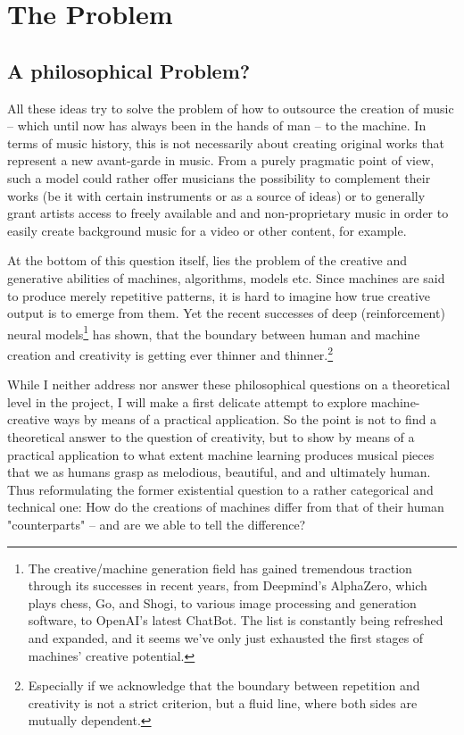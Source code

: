 \documentclass[a4paper, 10pt, xcolor=dvipsnames]{article} %
\begin{document}
\section{The Problem}
\subsection{A philosophical Problem?}

All these ideas try to solve the problem of how to outsource the creation of
music -- which until now has always been in the hands of man -- to the machine.
In terms of music history, this is not necessarily about creating original
works that represent a new avant-garde in music. From a purely pragmatic point
of view, such a model could rather offer musicians the possibility to
complement their works (be it with certain instruments or as a source of ideas)
or to generally grant artists access to freely available and and
non-proprietary music in order to easily create background music for a video or
other content, for example.

At the bottom of this question itself, lies the problem of the creative and
generative abilities of machines, algorithms, models etc. Since machines are
said to produce merely repetitive patterns, it is hard to imagine how true
creative output is to emerge from them. Yet the recent successes of deep
(reinforcement) neural models\footnote{The creative/machine generation field
  has gained tremendous traction through its successes in recent years, from
  Deepmind's AlphaZero, which plays chess, Go, and Shogi, to various image
  processing and generation software, to OpenAI's latest ChatBot. The list is
  constantly being refreshed and expanded, and it seems we've only just exhausted
  the first stages of machines' creative potential.} has shown, that the boundary
between human and machine creation and creativity is getting ever thinner and
thinner.\footnote{Especially if we acknowledge that the boundary between
  repetition and creativity is not a strict criterion, but a fluid line, where
  both sides are mutually dependent.}

While I neither address nor answer these philosophical questions on a
theoretical level in the project, I will make a first delicate attempt to
explore machine-creative ways by means of a practical application. So the point
is not to find a theoretical answer to the question of creativity, but to show
by means of a practical application to what extent machine learning produces
musical pieces that we as humans grasp as melodious, beautiful, and and
ultimately human. Thus reformulating the former existential question to a
rather categorical and technical one: How do the creations of machines differ
from that of their human "counterparts" -- and are we able to tell the
difference?
\end{document}
